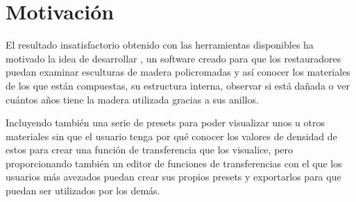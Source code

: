 \section{Motivación}

El resultado insatisfactorio obtenido con las herramientas disponibles ha motivado la idea de desarrollar \myTitle, un software creado para que los restauradores puedan examinar esculturas de madera policromadas y así conocer los materiales de los que están compuestas, su estructura interna, observar si está dañada o ver cuántos años tiene la madera utilizada gracias a sus anillos.

Incluyendo también una serie de presets para poder visualizar unos u otros materiales sin que el usuario tenga por qué conocer los valores de densidad de estos para crear una función de transferencia que los visualice, pero proporcionando también un editor de funciones de transferencias con el que los usuarios más avezados puedan crear sus propios presets y exportarlos para que puedan ser utilizados por los demás.
